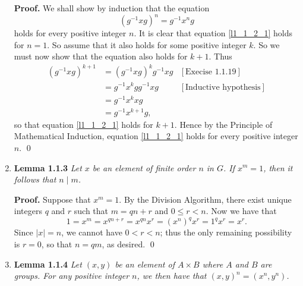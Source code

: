 \begin{enumerate}
      \textbf{Proof.} We shall show by induction that the equation
      \begin{equation}
         (g^{-1}xg)^n = g^{-1}x^ng \label{l1_1_2_1}
      \end{equation}
      holds for every positive integer $n$. It is clear that equation
      \eqref{l1_1_2_1} holds for $n = 1$. So assume that it also holds for some
      positive integer $k$. So we must now show that the equation also holds for 
      $k + 1$. Thus
      \begin{align*}
         (g^{-1}xg)^{k+1} &= (g^{-1}xg)^kg^{-1}xg &[\text{Execise 1.1.19}] \\
                     &= g^{-1}x^kgg^{-1}xg &[\text{Inductive hypothesis}] \\
                     &= g^{-1}x^kxg \\
                     &= g^{-1}x^{k+1}g,
      \end{align*}
      so that equation \eqref{l1_1_2_1} holds for $k+1$. Hence by the Principle 
      of Mathematical Induction, equation \eqref{l1_1_2_1} holds for every 
      positive integer $n$. \qed
   \item[]        \textbf{Lemma 1.1.3} \textit{Let $x$ be an element of finite
                  order $n$ in $G$. If $x^m = 1$, then it follows that
                  $n \mid m$.}

      \textbf{Proof.} Suppose that $x^m = 1$. By the Division Algorithm, there
      exist unique integers $q$ and $r$ such that $m = qn + r$ and
      $0 \le r < n$. Now we have that
      $$1 = x^m = x^{qn+r} = x^{qn}x^r = (x^n)^qx^r = 1^qx^r = x^r.$$
      Since $|x| = n$, we cannot have $0 < r < n$; thus the only remaining
      possibility is $r = 0$, so that $n = qm$, as desired. \qed
   \item[]        \textbf{Lemma 1.1.4} \textit{Let $(x, y)$ be an element of
                  $A \times B$ where $A$ and $B$ are groups. For any positive
                  integer $n$, we then have that $(x, y)^n = (x^n, y^n)$.}


\end{enumerate}
